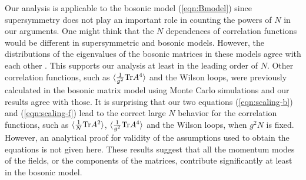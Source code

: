\documentclass[12pt,a4paper]{article}
\newcommand{\Tr}{\mbox{\rm Tr}}
\begin{document}
Our analysis is applicable to the bosonic model (\ref{eqn:Bmodel})
since supersymmetry does not play an important role in counting
the powers of $N$ in our arguments.
One might think that the $N$ dependences of correlation functions
would be different in supersymmetric and bosonic models. However,
the distributions of the eigenvalues of the bosonic matrices in these
models agree with each other \cite{AIKKT,MCsimu}. This supports
our analysis at least in the leading order of $N$.
Other correlation functions, such as $\langle\frac{1}{g^2}\Tr
A^4\rangle$ and the Wilson loops, were previously calculated
in the bosonic matrix model using Monte Carlo simulations
\cite{MCsimu,alpha} and our results agree with those.
It is surprising that our two equations (\ref{eqn:scaling-b}) and
(\ref{eqn:scaling-f}) lead to the correct large $N$ behavior for
the correlation functions, such as $\langle\frac{1}{N}\Tr A^2\rangle$,
$\langle\frac{1}{g^2}\Tr A^4\rangle$ and the Wilson loops, when $g^2N$
is fixed. However, an analytical proof for validity of the
assumptions used to obtain the equations is not given here.
These results suggest that all the momentum modes of the fields, or the
components of the matrices, contribute significantly at least in the
bosonic model.
\end{document}
